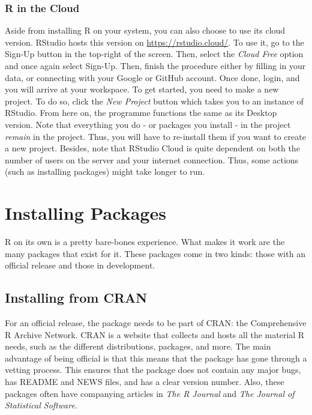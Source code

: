 \documentclass[
]{article}
\begin{document}
\hypertarget{r-in-the-cloud}{%
\subsubsection{R in the Cloud}\label{r-in-the-cloud}}

Aside from installing R on your system, you can also choose to use its cloud version. RStudio hosts this version on \url{https://rstudio.cloud/}. To use it, go to the Sign-Up button in the top-right of the screen. Then, select the \emph{Cloud Free} option and once again select Sign-Up. Then, finish the procedure either by filling in your data, or connecting with your Google or GitHub account. Once done, login, and you will arrive at your workspace. To get started, you need to make a new project. To do so, click the \emph{New Project} button which takes you to an instance of RStudio. From here on, the programme functions the same as its Desktop version. Note that everything you do - or packages you install - in the project \emph{remain} in the project. Thus, you will have to re-install them if you want to create a new project. Besides, note that RStudio Cloud is quite dependent on both the number of users on the server and your internet connection. Thus, some actions (such as installing packages) might take longer to run.

\hypertarget{installing-packages}{%
\section{Installing Packages}\label{installing-packages}}

R on its own is a pretty bare-bones experience. What makes it work are the many packages that exist for it. These packages come in two kinds: those with an official release and those in development.

\hypertarget{installing-from-cran}{%
\subsection{Installing from CRAN}\label{installing-from-cran}}

For an official release, the package needs to be part of CRAN: the Comprehensive R Archive Network. CRAN is a website that collects and hosts all the material R needs, such as the different distributions, packages, and more. The main advantage of being official is that this means that the package has gone through a vetting process. This ensures that the package does not contain any major bugs, has README and NEWS files, and has a clear version number. Also, these packages often have companying articles in \emph{The R Journal} and \emph{The Journal of Statistical Software}.
\end{document}
